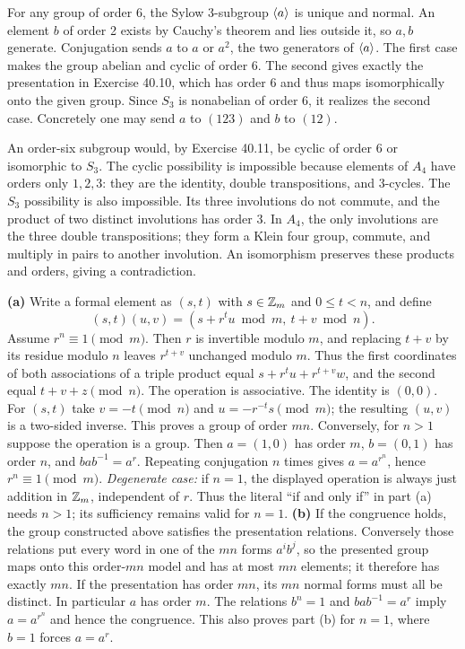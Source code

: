 For any group of order 6, the Sylow 3-subgroup $\langle a\rangle$ is unique and normal. An element $b$ of order 2 exists by Cauchy's theorem and lies outside it, so $a,b$ generate.
Conjugation sends $a$ to $a$ or $a^2$, the two generators of $\langle a\rangle$. The first case makes the group abelian and cyclic of order 6. The second gives exactly the presentation in Exercise 40.10, which has order 6 and thus maps isomorphically onto the given group.
Since $S_3$ is nonabelian of order 6, it realizes the second case. Concretely one may send $a$ to $(123)$ and $b$ to $(12)$.

An order-six subgroup would, by Exercise 40.11, be cyclic of order 6 or isomorphic to $S_3$.
The cyclic possibility is impossible because elements of $A_4$ have orders only $1,2,3$: they are the identity, double transpositions, and 3-cycles.
The $S_3$ possibility is also impossible. Its three involutions do not commute, and the product of two distinct involutions has order 3. In $A_4$, the only involutions are the three double transpositions; they form a Klein four group, commute, and multiply in pairs to another involution. An isomorphism preserves these products and orders, giving a contradiction.

\textbf{(a)} Write a formal element as $(s,t)$ with $s\in\mathbb{Z}_m$ and $0\le t<n$, and define
\[
(s,t)(u,v)=(s+r^tu\bmod m,\ t+v\bmod n).
\]
Assume $r^n\equiv1\pmod m$. Then $r$ is invertible modulo $m$, and replacing $t+v$ by its residue modulo $n$ leaves $r^{t+v}$ unchanged modulo $m$. Thus the first coordinates of both associations of a triple product equal
$s+r^tu+r^{t+v}w$, and the second equal $t+v+z\pmod n$. The operation is associative.
The identity is $(0,0)$. For $(s,t)$ take $v=-t\pmod n$ and $u=-r^{-t}s\pmod m$; the resulting $(u,v)$ is a two-sided inverse. This proves a group of order $mn$.
Conversely, for $n>1$ suppose the operation is a group. Then $a=(1,0)$ has order $m$, $b=(0,1)$ has order $n$, and $bab^{-1}=a^r$. Repeating conjugation $n$ times gives $a=a^{r^n}$, hence $r^n\equiv1\pmod m$.
\emph{Degenerate case:} if $n=1$, the displayed operation is always just addition in $\mathbb{Z}_m$, independent of $r$. Thus the literal ``if and only if'' in part (a) needs $n>1$; its sufficiency remains valid for $n=1$.
\textbf{(b)} If the congruence holds, the group constructed above satisfies the presentation relations. Conversely those relations put every word in one of the $mn$ forms $a^ib^j$, so the presented group maps onto this order-$mn$ model and has at most $mn$ elements; it therefore has exactly $mn$.
If the presentation has order $mn$, its $mn$ normal forms must all be distinct. In particular $a$ has order $m$. The relations $b^n=1$ and $bab^{-1}=a^r$ imply $a=a^{r^n}$ and hence the congruence. This also proves part (b) for $n=1$, where $b=1$ forces $a=a^r$.

